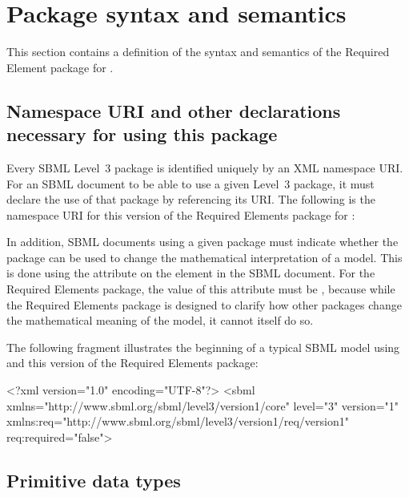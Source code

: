 
\section{Package syntax and semantics}
\label{syntax}

This section contains a definition of the syntax and semantics of the Required Element package for \sbmlthreecore.  

\subsection{Namespace URI and other declarations necessary for using this package}
\label{xml-namespace}

Every SBML Level~3 package is identified uniquely by an XML namespace URI.  For an SBML document to be able to use a given Level~3 package, it must declare the use of that package by referencing its URI.  The following is the namespace URI for this version of the Required Elements package for \sbmlthreecore:
\begin{center}
\end{center}

In addition, SBML documents using a given package must indicate whether the package can be used to change the mathematical interpretation of a model.  This is done using the attribute  on the  element in the SBML document.  For the Required Elements package, the value of this attribute must be , because while the Required Elements package is designed to clarify how other packages change the mathematical meaning of the model, it cannot itself do so.

The following fragment illustrates the beginning of a typical SBML model using \sbmlthreecore and this version of the Required Elements package:

\begin{example}
<?xml version="1.0" encoding="UTF-8"?>
<sbml xmlns="http://www.sbml.org/sbml/level3/version1/core" level="3" version="1"
      xmlns:req="http://www.sbml.org/sbml/level3/version1/req/version1" req:required="false">
\end{example}


\subsection{Primitive data types}
\label{new-primitive-types}

